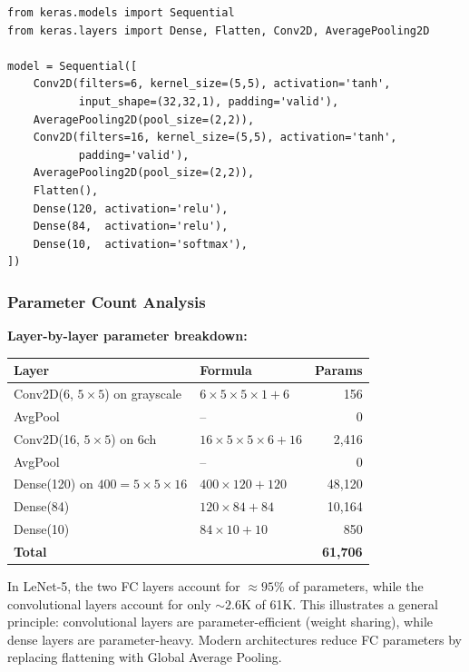 \documentclass[11pt,a4paper]{article}
\begin{document}
\begin{lstlisting}[caption={LeNet-5 in Keras}]
from keras.models import Sequential
from keras.layers import Dense, Flatten, Conv2D, AveragePooling2D

model = Sequential([
    Conv2D(filters=6, kernel_size=(5,5), activation='tanh',
           input_shape=(32,32,1), padding='valid'),
    AveragePooling2D(pool_size=(2,2)),
    Conv2D(filters=16, kernel_size=(5,5), activation='tanh',
           padding='valid'),
    AveragePooling2D(pool_size=(2,2)),
    Flatten(),
    Dense(120, activation='relu'),
    Dense(84,  activation='relu'),
    Dense(10,  activation='softmax'),
])
\end{lstlisting}



\subsubsection{Parameter Count Analysis}

\begin{tcolorbox}[colback=NoteGrayBg,colframe=NoteGray,boxrule=0.8pt,arc=3pt]
\textbf{Layer-by-layer parameter breakdown:}\\[4pt]
\begin{tabular}{@{}llr@{}}
\toprule
Layer & Formula & Params \\
\midrule
Conv2D(6, $5\times5$) on grayscale & $6\times5\times5\times1 + 6$ & 156 \\
AvgPool & -- & 0 \\
Conv2D(16, $5\times5$) on 6ch & $16\times5\times5\times6 + 16$ & 2,416 \\
AvgPool & -- & 0 \\
Dense(120) on $400=5\times5\times16$ & $400\times120 + 120$ & 48,120 \\
Dense(84) & $120\times84 + 84$ & 10,164 \\
Dense(10) & $84\times10 + 10$ & 850 \\
\midrule
\textbf{Total} & & \textbf{61,706} \\
\bottomrule
\end{tabular}
\end{tcolorbox}

\begin{insightbox}
In LeNet-5, the two FC layers account for $\approx 95\%$ of parameters, while the convolutional layers account for only $\sim2.6$K of 61K. This illustrates a general principle: convolutional layers are parameter-efficient (weight sharing), while dense layers are parameter-heavy. Modern architectures reduce FC parameters by replacing flattening with Global Average Pooling.
\end{insightbox}
\end{document}

